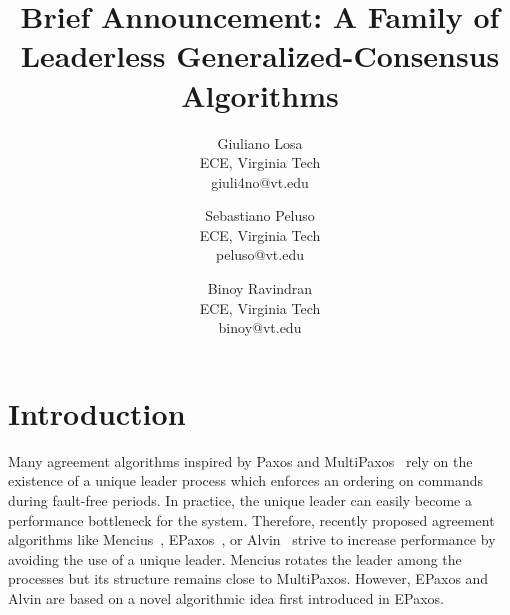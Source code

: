 

\title{\vspace{-0.8in}Brief Announcement: A Family of Leaderless Generalized-Consensus Algorithms}

\begin{comment}
\author{
{\small Author 1}\\
{\small ECE, Virginia Tech}\\
{\small email}
\and
{\small Author 2}\\
{\small ECE, Virginia Tech}\\
{\small email}
\and
{\small Author 3}\\
{\small ECE, Virginia Tech}\\
{\small email}
}
\end{comment}


\author{
Giuliano Losa\\
ECE, Virginia Tech\\
giuli4no@vt.edu
\and
Sebastiano Peluso\\
ECE, Virginia Tech\\
peluso@vt.edu
\and
Binoy Ravindran\\
ECE, Virginia Tech\\
binoy@vt.edu
}

\date{}



\maketitle

%

\vspace{-0.5cm}
\section{Introduction}

Many agreement algorithms inspired by Paxos and MultiPaxos~\cite{lamport2001paxos} rely on the existence of a unique leader process which enforces an ordering on commands during fault-free periods.
In practice, the unique leader can easily become a performance bottleneck for the system.
Therefore, recently proposed agreement algorithms like Mencius~\cite{MaoJunqueiraMarzullo08MenciusBuildingEfficientReplicatedStateMachine}, EPaxos~\cite{MoraruAndersenKaminsky13ThereIsMoreConsensusEgalitarianParliaments}, or Alvin~\cite{TurcuETAL14BeGeneralDontGiveUpConsistency} strive to increase performance by avoiding the use of a unique leader.
Mencius rotates the leader among the processes but its structure remains close to MultiPaxos. 
However, EPaxos and Alvin are based on a novel algorithmic idea first introduced in EPaxos.

